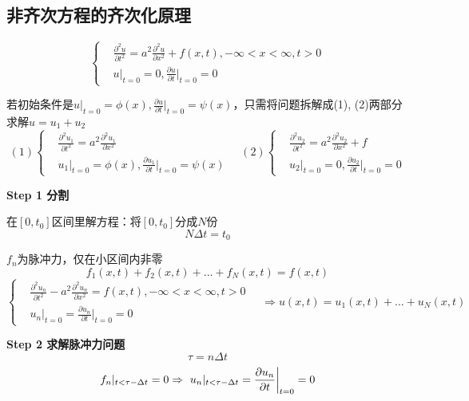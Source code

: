 \subsection{非齐次方程的齐次化原理}
\begin{ex}
$$      \left\{
        \begin{aligned}
                &\frac{\partial^2{u}}{\partial{t}^2}=a^2\frac{\partial^2{u}}{\partial{x}^2}+f(x,t), -\infty<x<\infty, t>0\\
                &u|_{t=0}=0,\frac{\partial u}{\partial t}\bigg|_{t=0}=0
        \end{aligned}
\right.$$
\begin{rem}
    若初始条件是$u|_{t=0}=\phi(x),\frac{\partial u}{\partial t}\bigg|_{t=0}=\psi(x)$，只需将问题拆解成(1), (2)两部分求解$u=u_1+u_2$
    $$      (1)\left\{
        \begin{aligned}
                &\frac{\partial^2{u_1}}{\partial{t}^2}=a^2\frac{\partial^2{u_1}}{\partial{x}^2}\\
                &u_1|_{t=0}=\phi(x),\frac{\partial u_1}{\partial t}\bigg|_{t=0}=\psi(x)
        \end{aligned}
\right.\quad (2)\left\{
        \begin{aligned}
                &\frac{\partial^2{u_2}}{\partial{t}^2}=a^2\frac{\partial^2{u_2}}{\partial{x}^2}+f\\
                &u_2|_{t=0}=0,\frac{\partial u_2}{\partial t}\bigg|_{t=0}=0
        \end{aligned}
\right.$$
\end{rem}

\noindent\textbf{Step 1 分割} 

在$[0,t_0]$区间里解方程：将$[0,t_0]$分成$N$份
$$N\Delta t=t_0$$

$f_n$为脉冲力，仅在小区间内非零
$$f_1(x,t)+f_2(x,t)+...+f_N(x,t)=f(x,t)$$
$$      \left\{
        \begin{aligned}
                &\frac{\partial^2{u_n}}{\partial{t}^2}-a^2\frac{\partial^2{u_n}}{\partial{x}^2}=f(x,t), -\infty<x<\infty, t>0\\
                &u_n|_{t=0}=\frac{\partial u_n}{\partial t}\bigg|_{t=0}=0
        \end{aligned}
\right.\quad\Rightarrow u(x,t)=u_1(x,t)+...+u_N(x,t)$$

\noindent\textbf{Step 2 求解脉冲力问题} 
$$\tau=n\Delta t$$
$$f_n|_{t<\tau-\Delta t}=0 \\\Rightarrow u_n|_{t<\tau-\Delta t}=\frac{\partial u_n}{\partial t}\bigg|_{t=0}=0$$


\end{ex}
